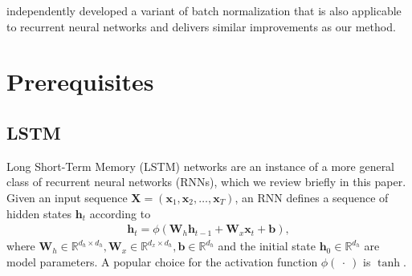 \documentclass{article} %
\newcommand{\vect}[1]{\mathbf{#1}}
\newcommand{\mat}[1]{\mathbf{#1}}
\newcommand{\reals}{\mathbb{R}}
\begin{document}
\citep{ba2016layer} independently developed a variant of batch normalization that is
also applicable to recurrent neural networks and delivers similar improvements as 
our method.

\section{Prerequisites}
\label{sec:prerequisites}

\subsection{LSTM}

Long Short-Term Memory (LSTM) networks are an instance of a more general class of recurrent neural
networks (RNNs), which we review briefly in this paper.  Given an input sequence $\mat{X} = ( \vect{x}_1,
\vect{x}_2, \ldots, \vect{x}_T )$, an RNN defines a sequence of hidden states $\vect{h}_t$
according to
\begin{eqnarray}
  \vect{h}_t = \phi(\mat{W}_h \vect{h}_{t-1} + \mat{W}_x  \vect{x}_t + \vect{b}),
\end{eqnarray}
where $\mat{W}_h \in \reals^{d_h \times d_h}, \mat{W}_x \in \reals^{d_x \times d_h}, \vect{b} \in \reals^{d_h}$
and the initial state $\vect{h}_0 \in \reals^{d_h}$ %
are model parameters.
A popular choice for the activation function $\phi(\ \cdot\ )$ is $\tanh$.
\end{document}
